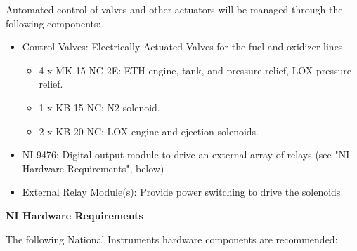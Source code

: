     Automated control of valves and other actuators will be managed through the following components:
    
    \begin{itemize}
        \item Control Valves: Electrically Actuated Valves for the fuel and oxidizer lines.
        \begin{itemize}
            \item 4 x MK 15 NC 2E: ETH engine, tank, and pressure relief, LOX pressure relief.
            \item 1 x KB 15 NC: N2 solenoid.
            \item 2 x KB 20 NC: LOX engine and ejection solenoids.
        \end{itemize}
        \item NI-9476: Digital output module to drive an external array of relays (see "NI Hardware Requirements", below)
        \item External Relay Module(s): Provide power switching to drive the solenoids
    \end{itemize}
    
    
    \textbf{NI Hardware Requirements}
    
    The following National Instruments hardware components are recommended:
    
